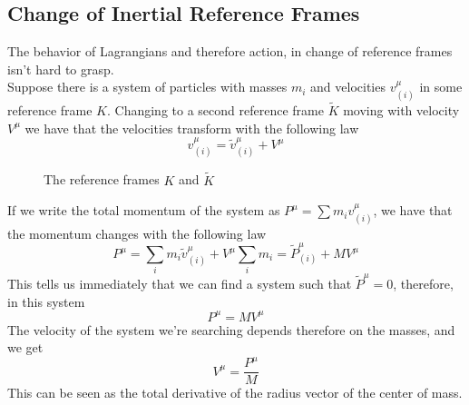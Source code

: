\documentclass[../admech.tex]{subfiles}
\begin{document}
\subsection{Change of Inertial Reference Frames}
The behavior of Lagrangians and therefore action, in change of reference frames isn't hard to grasp.\\
Suppose there is a system of particles with masses $m_i$ and velocities $v_{(i)}^\mu$ in some reference frame $K$. Changing to a second reference frame $\tilde{K}$ moving with velocity $V^\mu$ we have that the velocities transform with the following law
\begin{equation}
	v^\mu_{(i)}=\tilde{v}_{(i)}^\mu+V^\mu
	\label{eq:lagvintrlaw}
\end{equation}
\begin{figure}[H]
	\centering
	\caption{The reference frames $K$ and $\tilde{K}$}
	\label{fig:reframestrans}
\end{figure}
If we write the total momentum of the system as $P^\mu=\sum m_iv^\mu_{(i)}$, we have that the momentum changes with the following law
\begin{equation}
	P^\mu=\sum_im_i\tilde{v}^\mu_{(i)}+V^\mu\sum_im_i=\tilde{P}^\mu_{(i)}+MV^\mu
	\label{eq:lagpintrlaw}
\end{equation}
This tells us immediately that we can find a system such that $\tilde{P}^\mu=0$, therefore, in this system
\begin{equation}
	P^\mu=MV^\mu
	\label{eq:lagcmtr}
\end{equation}
The velocity of the system we're searching depends therefore on the masses, and we get
\begin{equation}
	V^\mu=\frac{P^\mu}{M}
	\label{eq:vcmlag}
\end{equation}
This can be seen as the total derivative of the radius vector of the center of mass.\\
\end{document}
